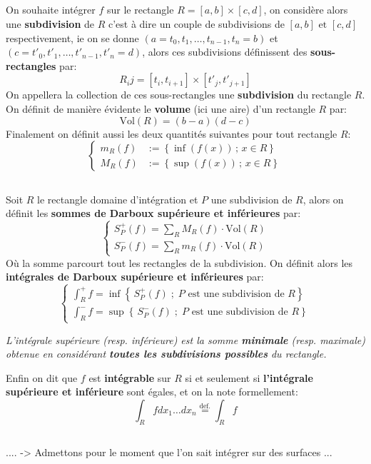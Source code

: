 \subsection*{}
On souhaite intégrer \(f\) sur le rectangle \(R = [a, b] \times [c, d]\), on considère alors une \textbf{subdivision} de \(R\) c'est à dire un couple de subdivisions de \([a, b] \text{ et } [c, d]\) respectivement, ie on se donne \((a = t_0, t_1, \ldots, t_{n-1}, t_n = b)\) et \((c = t'_0, t'_1, \ldots, t'_{n-1}, t'_n = d)\), alors ces subdivisions définissent des \textbf{sous-rectangles} par:
\[
   R_ij = [t_i, t_{i+1}] \times [t'_j, t'_{j+1}]   
\]
On appellera la collection de ces sous-rectangles une \textbf{subdivision} du rectangle \(R\). On définit de manière évidente le \textbf{volume} (ici une aire) d'un rectangle \(R\) par:
\[
   \text{Vol}(R) = (b - a)(d - c) 
\]
Finalement on définit aussi les deux quantités suivantes pour tout rectangle \(R\):
\[
   \begin{cases}
      m_R(f) &:= \left\{ \inf(f(x)) \, ; \, x \in R \right\}\\
      M_R(f) &:= \left\{ \sup(f(x)) \, ; \, x \in R \right\}
   \end{cases}   
\]
\pagebreak
\subsection*{}
Soit \(R\) le rectangle domaine d'intégration et \(P\) une subdivision de \(R\), alors on définit les \textbf{sommes de Darboux supérieure et inférieures} par:
\[
   \begin{cases}
      S_P^+(f) = \sum_R M_R(f) \cdot \text{Vol}(R)\\
      S_P^-(f) = \sum_R m_R(f) \cdot \text{Vol}(R) 
   \end{cases}
\] 
Où la somme parcourt tout les rectangles de la subdivision. On définit alors les \textbf{intégrales de Darboux supérieure et inférieures} par:
\[
   \begin{cases}
      \displaystyle\int_R^+{f} = \inf\left\{\, S_P^+(f)\; ; \; P \text{ est une subdivision de } R\right\}\\
      \displaystyle\int_R^-{f} = \sup\left\{\, S_P^-(f)\; ; \; P \text{ est une subdivision de } R\right\}
   \end{cases}
\]
\begin{center}
   \textit{
      L'intégrale supérieure (resp. inférieure) est la somme \textbf{minimale} (resp. maximale) obtenue en considérant \textbf{toutes les subdivisions possibles} du rectangle.
   }
\end{center}
Enfin on dit que \(f\) est \textbf{intégrable} sur \(R\) si et seulement si \textbf{l'intégrale supérieure et inférieure} sont égales, et on la note formellement:
\[
   \int_R f d x_1 \ldots d x_n \overset{\text{def.}}{=} \int_R f 
\]


\subsection*{}


.... -> Admettons pour le moment que l'on sait intégrer sur des surfaces ...
